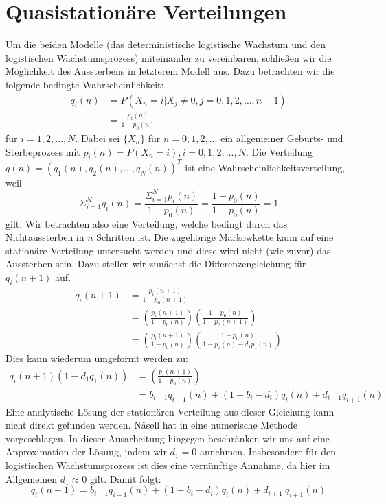 \documentclass{article}
\begin{document}
\section{Quasistationäre Verteilungen}
Um die beiden Modelle (das deterministische logistische Wachstum und den logistischen Wachstumsprozess) miteinander zu vereinbaren, schließen wir die Möglichkeit des Aussterbens in letzterem Modell aus. Dazu betrachten wir die folgende bedingte Wahrscheinlichkeit:
\begin{align*}
  q_i(n) &= P(X_n=i|X_j \neq 0, j = 0,1,2,\dots,n-1) \\
         &= \frac{p_i(n)}{1-p_0(n)}
\end{align*}
für $i = 1,2,\dots, N$.
Dabei sei $\{X_n\}$ für $n = 0,1,2,\dots$  ein allgemeiner Geburts- und Sterbeprozess mit $p_i(n) = P(X_n = i), i = 0,1,2,\dots,N$. Die Verteilung $q(n) = (q_1(n), q_2(n), \dots, q_N(n))^T$ ist eine Wahrscheinlichkeitsverteilung, weil
\[
  Σ_{i=1}^N q_i(n) = \frac{Σ_{i=1}^Np_i(n)}{1-p_0(n)} = \frac{1-p_0(n)}{1-p_0(n)} = 1
\]
gilt. Wir betrachten also eine Verteilung, welche bedingt durch das Nichtaussterben in $n$ Schritten ist. Die zugehörige Markowkette kann auf eine stationäre Verteilung untersucht werden und diese wird nicht (wie zuvor) das Aussterben sein. Dazu stellen wir zunächst die Differenzengleichung für $q_i(n+1)$ auf.
\begin{align*}
  q_i(n+1) &= \frac{p_i(n+1)}{1-p_0(n+1)} \\
           &= \left(\frac{p_i(n+1)}{1-p_0(n)}\right)\left(\frac{1-p_0(n)}{1-p_0(n+1)}\right) \\
           &= \left(\frac{p_i(n+1)}{1-p_0(n)}\right)\left(\frac{1-p_0(n)}{1-p_0(n)-d_1p_1(n)}\right)
\end{align*}
Dies kann wiederum umgeformt werden zu:
\begin{align*}
  q_i(n+1)(1-d_1q_1(n)) &= \left(\frac{p_i(n+1)}{1-p_0(n)}\right) \\
                        &= b_{i-1}q_{i-1}(n) + (1-b_i-d_i)q_i(n) + d_{i+1}q_{i+1}(n)
\end{align*}
Eine analytische Lösung der stationären Verteilung aus dieser Gleichung kann nicht direkt gefunden werden. Nåsell hat in \cite{nsll} eine numerische Methode vorgeschlagen. In dieser Ausarbeitung hingegen beschränken wir uns auf eine Approximation der Lösung, indem wir $d_1 = 0$ annehmen. Insbesondere für den logistischen Wachstumsprozess ist dies eine vernünftige Annahme, da hier im Allgemeinen $d_1 \approx 0$ gilt. Damit folgt:
\[
  \bar{q}_i(n+1) = b_{i-1}\bar{q}_{i-1}(n) + (1 - b_i - d_i)\bar{q}_i(n) + d_{i+1}\bar{~}{q}_{i+1}(n)
\]
\end{document}
